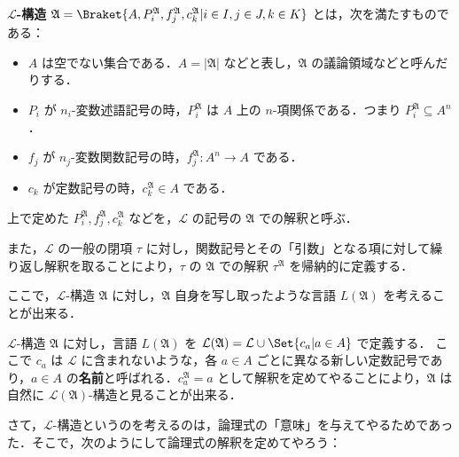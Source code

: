 \documentclass[a4j,xelatex,ja=standard]{ltjsarticle}
\begin{document}
\begin{definition}
 {\bfseries $\mathcal{L}$-構造} $\mathfrak{A} = \Braket{ A, P_i^\mathfrak{A}, f_j^\mathfrak{A}, c_k^\mathfrak{A} | i \in I, j \in J, k \in K }$ とは，次を満たすものである：
 \begin{itemize}
  \item $A$ は空でない集合である．$A = |\mathfrak{A}|$ などと表し，$\mathfrak{A}$ の議論領域などと呼んだりする．
  \item $P_i$ が $n_i$-変数述語記号の時，$P_i^\mathfrak{A}$ は $A$ 上の $n$-項関係である．つまり $P_i^\mathfrak{A} \subseteq A^n$．
  \item $f_j$ が $n_j$-変数関数記号の時，$f_j^\mathfrak{A}: A^n \rightarrow A$ である．
  \item $c_k$ が定数記号の時，$c_k^\mathfrak{A} \in A$ である．
 \end{itemize}
 上で定めた $P_i^\mathfrak{A}, f_j^\mathfrak{A}, c_k^\mathfrak{A}$ などを，$\mathcal{L}$ の記号の $\mathfrak{A}$ での解釈と呼ぶ．

 また，$\mathcal{L}$ の一般の閉項 $\tau$ に対し，関数記号とその「引数」となる項に対して繰り返し解釈を取ることにより，$\tau$ の $\mathfrak{A}$ での解釈 $\tau^\mathfrak{A}$ を帰納的に定義する．
\end{definition}

ここで，$\mathcal{L}$-構造 $\mathfrak{A}$ に対し，$\mathfrak{A}$ 自身を写し取ったような言語 $L(\mathfrak{A})$ を考えることが出来る．

\begin{definition}
 $\mathcal{L}$-構造 $\mathfrak{A}$ に対し，言語 $L(\mathfrak{A})$ を
  $\mathcal{L}(\mathfrak{A}) = \mathcal{L} \cup  \Set{ c_a | a \in A }$ で定義する．
 ここで $c_a$ は $\mathcal{L}$ に含まれないような，各 $a \in A$ ごとに異なる新しい定数記号であり，$a \in A$ の{\bfseries 名前}と呼ばれる．$c_a^\mathfrak{A} = a$ として解釈を定めてやることにより，$\mathfrak{A}$ は自然に $\mathcal{L}(\mathfrak{A})$-構造と見ることが出来る．
\end{definition}

さて，$\mathcal{L}$-構造というのを考えるのは，論理式の「意味」を与えてやるためであった．そこで，次のようにして論理式の解釈を定めてやろう：
\end{document}
